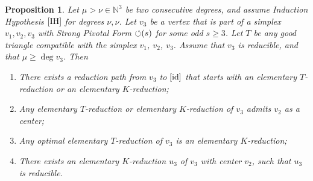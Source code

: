 \documentclass[reqno,oneside,11pt]{amsart}
\theoremstyle{plain}
\newtheorem{proposition}[theorem]{Proposition}
\theoremstyle{definition}
\newcommand{\N}{\mathbb{N}}
\newcommand{\PF}{\text{$\circlearrowleft$\!\,}}
\newcommand{\id}{\text{\rm id}}
\renewcommand{\ge}{\geqslant}
\begin{document}
\begin{proposition} \label{pro:slide}
Let $\mu > \nu \in \N^3$ be two consecutive degrees, and assume Induction Hypothesis $\ref{IH}$ for degrees $\nu, \nu$.
Let $v_3$ be a vertex that is part of a simplex $v_1, v_2, v_3$ with Strong Pivotal Form $\PF(s)$ for some odd $s \ge 3$.
Let $T$ be any good triangle compatible with the simplex $v_1$, $v_2$, $v_3$.
Assume that $v_3$ is reducible, and that $\mu \ge \deg v_3$.
Then
\begin{enumerate}
\item \label{slide1} There exists a reduction path from $v_3$ to $[\id]$ that
starts with an elementary $T$-reduction or an elementary $K$-reduction;
\item \label{slide2} Any elementary $T$-reduction or elementary $K$-reduction
of $v_3$ admits $v_2$ as a center;
\item \label{slide3} Any optimal elementary $T$-reduction of $v_3$ is an elementary $K$-reduction;
\item \label{slide4} There exists an elementary $K$-reduction $u_3$ of $v_3$ with center $v_2$, such that $u_3$ is reducible.
\end{enumerate}
\end{proposition}
\end{document}

